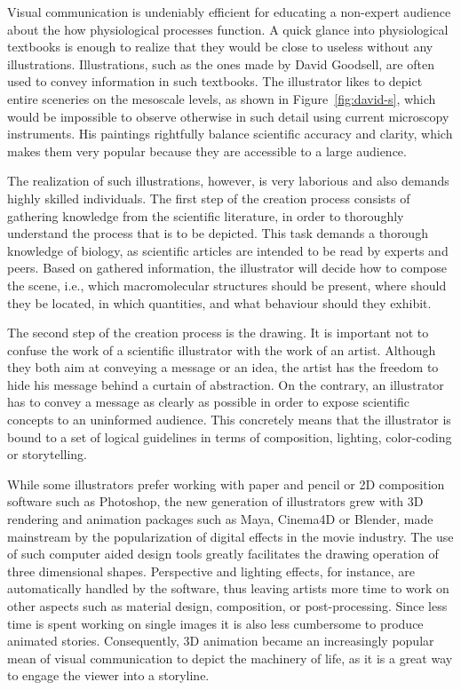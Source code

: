 Visual communication is undeniably efficient for educating a non-expert audience about the how physiological processes function.
A quick glance into physiological textbooks is enough to realize that they would be close to useless without any illustrations.
Illustrations, such as the ones made by David Goodsell, are often used to convey information in such textbooks.
The illustrator likes to depict entire sceneries on the mesoscale levels, as shown in Figure~\ref{fig:david-s}, which would be impossible to observe otherwise in such detail using current microscopy instruments.
His paintings rightfully balance scientific accuracy and clarity, which makes them very popular because they are accessible to a large audience.

The realization of such illustrations, however, is very laborious and also demands highly skilled individuals.
The first step of the creation process consists of gathering knowledge from the scientific literature, in order to thoroughly understand the process that is to be depicted.
This task demands a thorough knowledge of biology, as scientific articles are intended to be read by experts and peers.
Based on gathered information, the illustrator will decide how to compose the scene, i.e., which macromolecular structures should be present, where should they be located, in which quantities, and what behaviour should they exhibit.

The second step of the creation process is the drawing. 
It is important not to confuse the work of a scientific illustrator with the work of an artist.
Although they both aim at conveying a message or an idea, the artist has the freedom to hide his message behind a curtain of abstraction.
On the contrary, an illustrator has to convey a message as clearly as possible in order to expose scientific concepts to an uninformed audience.
This concretely means that the illustrator is bound to a set of logical guidelines in terms of composition, lighting, color-coding or storytelling.

While some illustrators prefer working with paper and pencil or 2D composition software such as Photoshop, the new generation of illustrators grew with 3D rendering and animation packages such as Maya, Cinema4D or Blender, made mainstream by the popularization of digital effects in the movie industry.
The use of such computer aided design tools greatly facilitates the drawing operation of three dimensional shapes.
Perspective and lighting effects, for instance, are automatically handled by the software, thus leaving artists more time to work on other aspects such as material design, composition, or post-processing.
Since less time is spent working on single images it is also less cumbersome to produce animated stories.
Consequently, 3D animation became an increasingly popular mean of visual communication to depict the machinery of life, as it is a great way to engage the viewer into a storyline.

